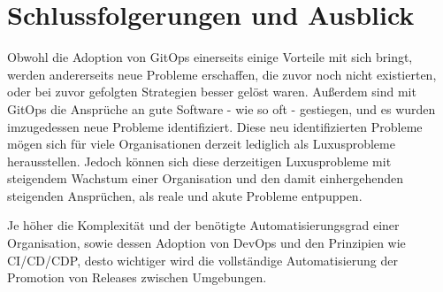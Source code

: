 \chapter{Schlussfolgerungen und Ausblick}

Obwohl die Adoption von GitOps einerseits einige Vorteile mit sich bringt,
werden andererseits neue Probleme erschaffen,
die zuvor noch nicht existierten,
oder bei zuvor gefolgten Strategien besser gelöst waren.
Außerdem sind mit GitOps die Ansprüche an
gute Software - wie so oft - gestiegen,
und es wurden imzugedessen neue Probleme identifiziert.
Diese neu identifizierten Probleme mögen sich für viele Organisationen derzeit lediglich
als Luxusprobleme herausstellen.
Jedoch können sich diese derzeitigen Luxusprobleme
mit steigendem Wachstum einer Organisation
und den damit einhergehenden steigenden Ansprüchen,
als reale und akute Probleme
entpuppen.
\bigskip

\noindent
Je höher die Komplexität und der benötigte Automatisierungsgrad einer Organisation, sowie dessen Adoption von DevOps und den Prinzipien wie CI/CD/CDP, 
desto wichtiger wird die vollständige Automatisierung der Promotion von Releases zwischen Umgebungen.








